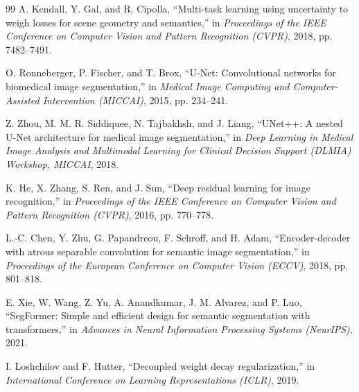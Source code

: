 \documentclass[journal,compsoc]{IEEEtran}
\begin{document}
\begin{thebibliography}{99}
A. Kendall, Y. Gal, and R. Cipolla, ``Multi-task learning using uncertainty to weigh losses for scene geometry and semantics,'' in \textit{Proceedings of the IEEE Conference on Computer Vision and Pattern Recognition (CVPR)}, 2018, pp. 7482--7491.

O. Ronneberger, P. Fischer, and T. Brox, ``U-Net: Convolutional networks for biomedical image segmentation,'' in \textit{Medical Image Computing and Computer-Assisted Intervention (MICCAI)}, 2015, pp. 234--241.

Z. Zhou, M. M. R. Siddiquee, N. Tajbakhsh, and J. Liang, ``UNet++: A nested U-Net architecture for medical image segmentation,'' in \textit{Deep Learning in Medical Image Analysis and Multimodal Learning for Clinical Decision Support (DLMIA) Workshop, MICCAI}, 2018.

K. He, X. Zhang, S. Ren, and J. Sun, ``Deep residual learning for image recognition,'' in \textit{Proceedings of the IEEE Conference on Computer Vision and Pattern Recognition (CVPR)}, 2016, pp. 770--778.

L.-C. Chen, Y. Zhu, G. Papandreou, F. Schroff, and H. Adam, ``Encoder-decoder with atrous separable convolution for semantic image segmentation,'' in \textit{Proceedings of the European Conference on Computer Vision (ECCV)}, 2018, pp. 801--818.

E. Xie, W. Wang, Z. Yu, A. Anandkumar, J. M. Alvarez, and P. Luo, ``SegFormer: Simple and efficient design for semantic segmentation with transformers,'' in \textit{Advances in Neural Information Processing Systems (NeurIPS)}, 2021.

I. Loshchilov and F. Hutter, ``Decoupled weight decay regularization,'' in \textit{International Conference on Learning Representations (ICLR)}, 2019.

\end{thebibliography}
\end{document}
